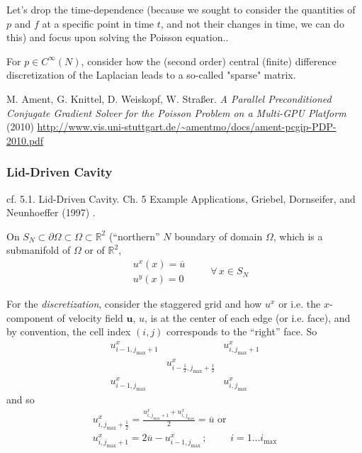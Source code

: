 \documentclass[10pt]{amsart}
\begin{document}
\begin{multicols*}{2}
Let's drop the time-dependence (because we sought to consider the quantities of $p$ and $f$ at a specific point in time $t$, and not their changes in time, we can do this) and focus upon solving the Poisson equation..  

For $p\in C^{\infty}(N)$, consider how the (second order) central (finite) difference discretization of the Laplacian leads to a so-called "sparse" matrix.  

M. Ament, G. Knittel, D. Weiskopf, W. Straßer.  \emph{A Parallel Preconditioned Conjugate Gradient Solver for the Poisson Problem on a Multi-GPU Platform}  (2010)
\url{http://www.vis.uni-stuttgart.de/~amentmo/docs/ament-pcgip-PDP-2010.pdf}



 
\subsubsection{Lid-Driven Cavity}

cf. 5.1. Lid-Driven Cavity.   Ch. 5 Example Applications, Griebel, Dornseifer, and Neunhoeffer (1997) \cite{GDN1997}.

On $S_N \subset \partial \Omega \subset \Omega \subset \mathbb{R}^2$ (``northern'' $N$ boundary of domain $\Omega$, which is a submanifold of $\Omega$ or of $\mathbb{R}^2$,
\begin{equation}
\begin{aligned}
  & u^x(x) = \overline{u} \\ 
  & u^y(x) = 0 
  \end{aligned} \qquad \, \forall \, x \in S_N
\end{equation}

For the \emph{discretization}, consider the staggered grid and how $u^x$ or i.e. the $x$-component of velocity field $\mathbf{u}$, $u$, is at the center of each edge (or i.e. face), and by convention, the cell index $(i,j)$ corresponds to the ``right'' face.  So
\[
\begin{matrix}
  u^x_{i-1,j_{\text{max}}+1} & & u^x_{i,j_{\text{max}} +1}   \\
  & u^x_{i-\frac{1}{2},j_{\text{max}}+\frac{1}{2}} & \\
  u^x_{i-1,j_{\text{max}}} & & u^x_{i,j_{\text{max}}} 
  \end{matrix}
\]
and so
\begin{equation}
  \begin{gathered}
    u^x_{i,j_{\text{max}}+\frac{1}{2}} = \frac{ u^x_{i,j_{\text{max}}+1} + u^x_{i,j_{\text{max}}} }{2} = \overline{u} \text{ or } \\
u^x_{i,j_{\text{max}}+1} = 2\overline{u} - u^x_{i-1,j_{\text{max}}} \, ; \, \qquad \, i = 1 \dots i_{\text{max}}
    \end{gathered}
  \end{equation}


\end{multicols*}
\end{document}
